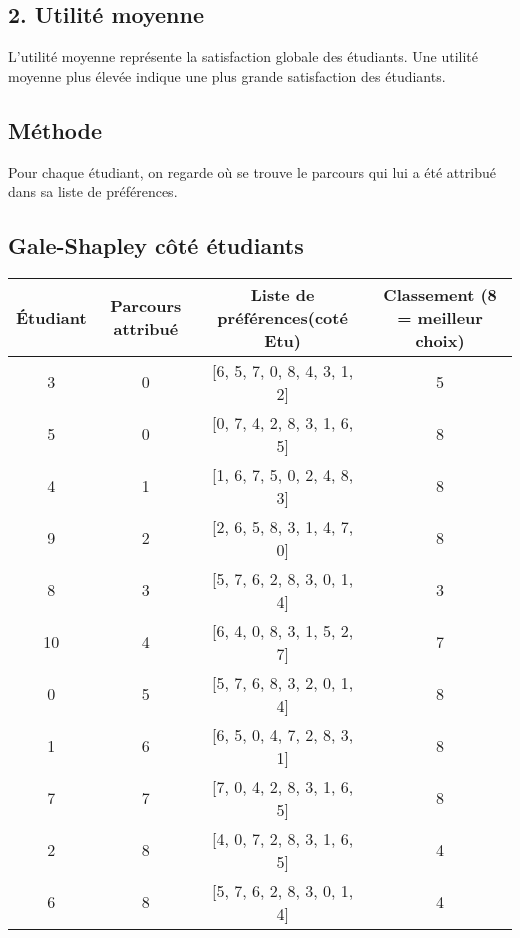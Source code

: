 \documentclass[a4paper,11pt]{article}
\begin{document}
\subsection*{2. Utilité moyenne}

L'utilité moyenne représente la satisfaction globale des étudiants. Une utilité moyenne plus élevée indique une plus grande satisfaction des étudiants.


\subsection*{Méthode}
Pour chaque étudiant, on regarde où se trouve le parcours qui lui a été attribué dans sa liste de préférences.

\subsection*{Gale-Shapley côté étudiants}


\begin{tabular}{|c|c|c|c|}
\hline
Étudiant & Parcours attribué & Liste de préférences(coté Etu) & Classement (8 = meilleur choix) \\
\hline
3 & 0 & [6, 5, 7, 0, 8, 4, 3, 1, 2] & 5 \\
5 & 0 & [0, 7, 4, 2, 8, 3, 1, 6, 5] & 8 \\
4 & 1 & [1, 6, 7, 5, 0, 2, 4, 8, 3] & 8 \\
9 & 2 & [2, 6, 5, 8, 3, 1, 4, 7, 0] & 8 \\
8 & 3 & [5, 7, 6, 2, 8, 3, 0, 1, 4] & 3 \\
10 & 4 & [6, 4, 0, 8, 3, 1, 5, 2, 7] & 7 \\
0 & 5 & [5, 7, 6, 8, 3, 2, 0, 1, 4] & 8 \\
1 & 6 & [6, 5, 0, 4, 7, 2, 8, 3, 1] & 8 \\
7 & 7 & [7, 0, 4, 2, 8, 3, 1, 6, 5] & 8 \\
2 & 8 & [4, 0, 7, 2, 8, 3, 1, 6, 5] & 4 \\
6 & 8 & [5, 7, 6, 2, 8, 3, 0, 1, 4] & 4 \\
\hline
\end{tabular}
\end{document}
